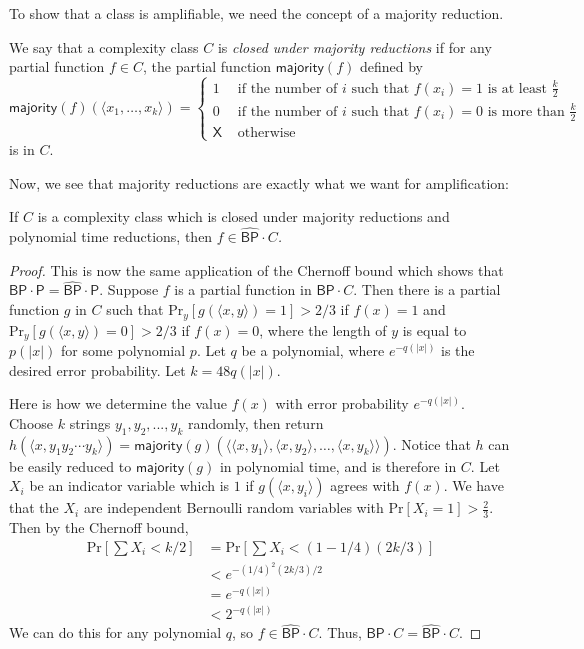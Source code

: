 \documentclass[11pt]{article}
\newcommand{\pr}{\text{Pr}}
\newcommand{\bp}{\textsf{BP}}
\newcommand{\strongbp}{\widehat{\textsf{BP}}}
\newcommand{\p}{\textsf{P}}
\newcommand{\x}{\textsf{X}}
\newcommand{\majority}{\textsf{majority}}
\begin{document}
To show that a class is amplifiable, we need the concept of a majority reduction.
\begin{definition}\label{defmajority}
We say that a complexity class $C$ is \emph{closed under majority reductions} if for any partial function $f \in C$, the partial function $\majority(f)$ defined by
$$\majority(f)(\langle x_1, \ldots, x_k\rangle) = 
\begin{cases}1 & \text{ if the number of $i$ such that }f(x_i) = 1\text{ is at least $\frac{k}{2}$} \\
0 & \text{ if the number of $i$ such that }f(x_i) = 0\text{ is more than $\frac{k}{2}$}\\
\x & \text{ otherwise}
\end{cases}$$
is in $C$.
\end{definition}
Now, we see that majority reductions are exactly what we want for amplification:
\begin{lemma}\label{majorityimpliesamplify}
If $C$ is a complexity class which is closed under majority reductions and polynomial time reductions, then \emph{$f\in\strongbp \cdot C$.}
\end{lemma}
\begin{proof}
This is now the same application of the Chernoff bound which shows that $\bp \cdot \p = \strongbp \cdot \p$. Suppose $f$ is a partial function in $\bp \cdot C$. Then there is a partial function $g$ in $C$ such that $\pr_y [g(\langle x,y\rangle) = 1] > 2/3$ if $f(x) = 1$ and $\pr_y [g(\langle x, y\rangle) = 0] > 2/3$ if $f(x) = 0$, where the length of $y$ is equal to $p(|x|)$ for some polynomial $p$. Let $q$ be a polynomial, where $e^{-q(|x|)}$ is the desired error probability. Let $k = 48q(|x|)$.

Here is how we determine the value $f(x)$ with error probability $e^{-q(|x|)}$. Choose $k$ strings $y_1,y_2,...,y_k$ randomly, then return $h(\langle x, y_1y_2\cdots y_k\rangle) = \majority(g)(\langle \langle x, y_1 \rangle, \langle x, y_2 \rangle, \ldots, \langle x, y_k \rangle \rangle)$. Notice that $h$ can be easily reduced to $\majority(g)$ in polynomial time, and is therefore in $C$.
Let $X_i$ be an indicator variable which is $1$ if $g(\langle x,y_i\rangle)$ agrees with $f(x)$. We have that the $X_i$ are independent Bernoulli random variables with $\pr\left[X_i = 1\right] > \frac{2}{3}$.  Then by the Chernoff bound,
\begin{align*}
\pr\left[\sum X_i < k/2\right] &= \pr\left[\sum X_i < (1 - 1/4)(2k/3)\right]\\
&< e^{-(1/4)^2 (2k/3) / 2}\\
&= e^{-q(|x|)} \\
&< 2^{-q(|x|)}
\end{align*}
We can do this for any polynomial $q$, so $f \in \strongbp \cdot C$. Thus, $\bp \cdot C = \strongbp \cdot C$.
\end{proof}
\end{document}
